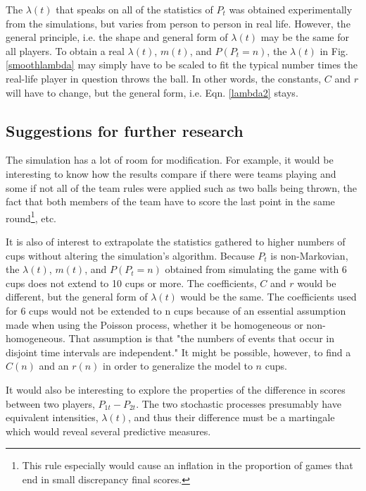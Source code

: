 \documentclass{article}
\begin{document}
The $\lambda(t)$ that speaks on all of the statistics of $P_t$ was obtained experimentally from the simulations, but varies from person to person in real life. However, the general principle, i.e. the shape and general form of $\lambda(t)$ may be the same for all players. To obtain a real $\lambda(t)$, $m(t)$, and $P(P_t = n)$, the $\lambda(t)$ in Fig. \ref{smoothlambda} may simply have to be scaled to fit the typical number times the real-life player in question throws the ball. In other words, the constants, $C$ and $r$ will have to change, but the general form, i.e. Eqn. \ref{lambda2} stays.

\subsection{Suggestions for further research}
The simulation has a lot of room for modification. For example, it would be interesting to know how the results compare if there were teams playing and some if not all of the team rules were applied such as two balls being thrown, the fact that both members of the team have to score the last point in the same round\footnote{This rule especially would cause an inflation in the proportion of games that end in small discrepancy final scores.}, etc. 

It is also of interest to extrapolate the statistics gathered to higher numbers of cups without altering the simulation's algorithm. Because $P_t$ is non-Markovian, the $\lambda(t)$, $m(t)$, and $P(P_t = n)$ obtained from simulating the game with 6 cups does not extend to 10 cups or more. The coefficients, $C$ and $r$ would be different, but the general form of $\lambda(t)$ would be the same. The coefficients used for 6 cups would not be extended to n cups because of an essential assumption made when using the Poisson process, whether it be homogeneous or non-homogeneous. That assumption is that "the numbers of events that occur in disjoint time intervals are independent." \cite{georgesbook} It might be possible, however, to find a $C(n)$ and an $r(n)$ in order to generalize the model to $n$ cups.

It would also be interesting to explore the properties of the difference in scores between two players, $P_{1t} - P_{2t}$. The two stochastic processes presumably have equivalent intensities, $\lambda(t)$, and thus their difference must be a martingale \cite{neftci} which would reveal several predictive measures.  



\end{document}

